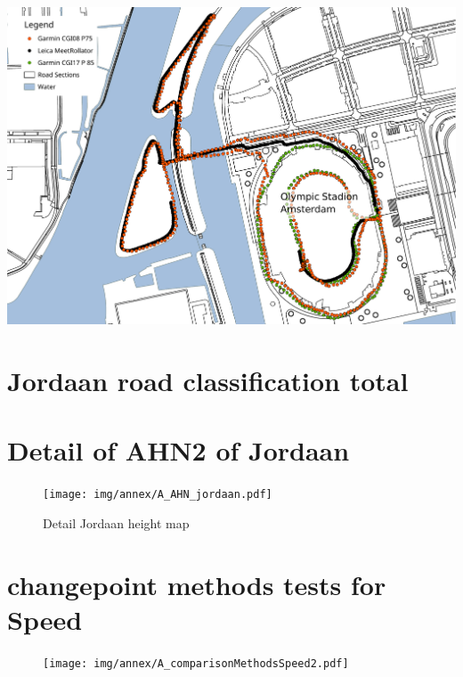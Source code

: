 \begin{appendix}
\includegraphics[width=\textwidth]{img/annex/A_failedmeasurementsMap.pdf}
\clearpage

\section{Jordaan road classification total}\label{Ajordaan}


\section{Detail of AHN2 of Jordaan}\label{AAHN}
\begin{figure}[th]
\texttt{[image: img/annex/A\_AHN\_jordaan.pdf]}
\centering
\caption{Detail Jordaan height map\label{jordaanahn}}
\end{figure} 

\clearpage

\section{changepoint methods tests for Speed}\label{Acptest}
\begin{figure}
\texttt{[image: img/annex/A\_comparisonMethodsSpeed2.pdf]}
\end{figure}
\clearpage



\end{appendix}